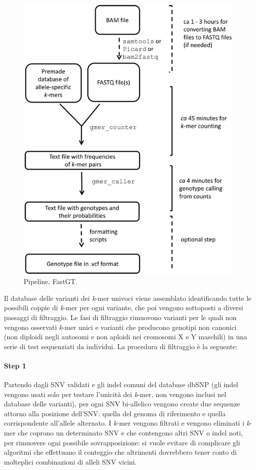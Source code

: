 \documentclass[../main.tex]{subfiles}
\begin{document}
 \begin{figure}[h!]
	\centering
  	\captionsetup{justification=centering}
  	\includegraphics[scale=.25]{images/fastgt-pipeline.jpg}
  	\caption{Pipeline, FastGT.}
  	\label{fig:fastgt}
\end{figure}

\noindent
Il database delle varianti dei \textit{k}-mer univoci viene assemblato identificando tutte le possibili coppie di \textit{k}-mer per ogni variante, che poi vengono sottoposti a diversi passaggi di filtraggio. Le fasi di filtraggio rimuovono varianti per le quali non vengono osservati \textit{k}-mer unici e varianti che producono genotipi non canonici (non diploidi negli autosomi e non aploidi nei cromosomi X e Y maschili) in una serie di test sequenziati da individui. La procedura di filtraggio è la seguente:

\paragraph{Step 1} Partendo dagli SNV validati e gli indel comuni del database dbSNP (gli indel vengono usati solo per testare l'unicità dei \textit{k}-mer, non vengono inclusi nel database delle varianti), per ogni SNV bi-allelico vengono create due sequenze attorno alla posizione dell'SNV: quella del genoma di riferimento e quella corrispondente all'allele alternato. I \textit{k}-mer vengono filtrati e vengono eliminati i \textit{k}-mer che coprono un determinato SNV e che contengono altri SNV o indel noti, per rimuovere ogni possibile sovrapposizione: si vuole evitare di complicare gli algoritmi che effettuano il conteggio che altrimenti dovrebbero tener conto di molteplici combinazioni di alleli SNV vicini. 
\end{document}
